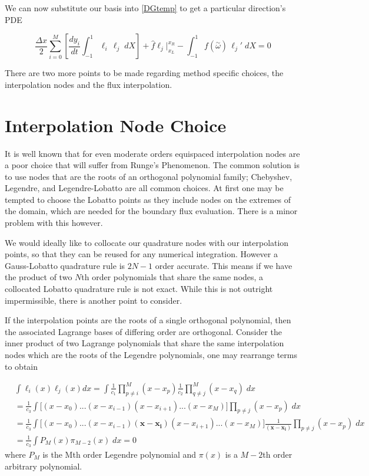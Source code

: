 \documentclass[letterpaper,12pt]{report}
\newcommand{\be}{\begin{equation}}
\newcommand{\ben}[1]{\begin{equation}\label{#1}}
\newcommand{\ee}{\end{equation}}
\newcommand{\aomega}{\overset{\sim}{\omega}}				%
\begin{document}
We can now substitute our basis into \eqref{DGtemp} to get a particular direction's PDE

\ben{DGJoshTemp} \frac{\Delta x}{2}	\sum_{i=0}^M \left[ \frac{d y_i}{dt}	\int_{-1}^{1}\ell_i  \, \ell_j \;dX \right]
+\hat{f}\ell_j \Big|^{x_R}_{x_L} 
- \int_{-1}^{1} f(\aomega) \, \ell_j' \;dX = 0 \ee

There are two more points to be made regarding method specific choices, the interpolation nodes and the flux interpolation.
%
\section{Interpolation Node Choice}
It is well known that for even moderate orders equispaced interpolation nodes are a poor choice that will suffer from Runge's Phenomenon. The common solution is to use nodes that are the roots of an orthogonal polynomial family; Chebyshev, Legendre, and Legendre-Lobatto are all common choices. At first one may be tempted to choose the Lobatto points as they include nodes on the extremes of the domain, which are needed for the boundary flux evaluation. There is a minor problem with this however. 

We would ideally like to collocate our quadrature nodes with our interpolation points, so that they can be reused for any numerical integration. However a Gauss-Lobatto quadrature rule is $2N-1$ order accurate. This means if we have the product of two $N$th order polynomials that share the same nodes, a collocated Lobatto quadrature rule is not exact. While this is not outright impermissible, there is another point to consider.

If the interpolation points are the roots of a single orthogonal polynomial, then the associated Lagrange bases of differing order are orthogonal. Consider the inner product of two Lagrange polynomials that share the same interpolation nodes which are the roots of the Legendre polynomials, one may rearrange terms to obtain

\be \begin{split} &\int \ell_i(x) \ell_j(x) dx = \int \frac{1}{c_1} \prod_{p\neq i}^M (x-x_p) \frac{1}{c_2}\prod_{q \neq j}^M (x-x_q) \;dx \\ 
&=\frac{1}{c_3} \int  \Big[(x-x_0)...(x-x_{i-1})(x-x_{i+1})...(x-x_M)\Big]\prod_{p \neq j} (x-x_p) \;dx\\
&=\frac{1}{c_3} \int  \Big[(x-x_0)...(x-x_{i-1}) \boldsymbol{(x-x_i)}(x-x_{i+1})...(x-x_M)\Big] \frac{1}{\boldsymbol{(x-x_i)}}\prod_{p \neq j} (x-x_p) \;dx\\
&=\frac{1}{c_3} \int  P_M(x) \pi_{M-2}(x) \;dx= 0\end{split}\ee
where $P_M$ is the Mth order Legendre polynomial and $\pi(x)$ is a $M-2$th order arbitrary polynomial.
\end{document}
